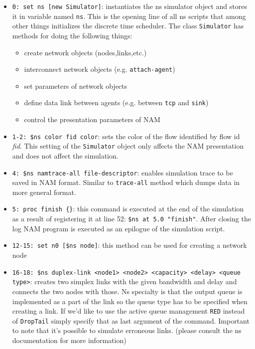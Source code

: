 \documentclass[a4paper]{article}
\begin{document}
\begin{itemize}

    \item \verb!0: set ns [new Simulator]!: instantiates the ns simulator object and stores it in variable named
          \verb!ns!. This is the opening line of all ns scripts that among other things initializes the
          discrete
          time scheduler. The class \verb!Simulator! has methods for doing the following things:

          \begin{itemize}
              \item create network objects (nodes,links,etc.)
              \item interconnect network objects (e.g. \verb!attach-agent!)
              \item set parameters of network objects
              \item define data link between agents (e.g. between \verb!tcp! and \verb!sink!)
              \item control the presentation parameters of NAM
          \end{itemize}

    \item \verb!1-2: $ns color fid color!: sets the color of the flow identified by flow id \emph{fid}. This setting of the
          \verb!Simulator! object only affects the NAM presentation and does not affect the simulation.

    \item \verb!4: $ns namtrace-all file-descriptor!: enables simulation trace to be saved in NAM format. Similar to
          \verb!trace-all!
          method which dumps data in more general format.

    \item \verb!5: proc finish {}!: this command is executed at the end of the simulation as a result of registering it
          at
          line 52: \verb!$ns at 5.0 "finish"!. After closing the log NAM program is executed as an epilogue of the
          simulation
          script.

    \item \verb!12-15: set n0 [$ns node]!: this method can be used for creating a network node

    \item \verb!16-18: $ns duplex-link <node1> <node2> <capacity> <delay> <queue type>!: creates two simplex links with the given bandwidth and delay and connects the two
          nodes
          with those. Ns specialty is that the output queue is implemented as a part of the link so the queue type has
          to be
          specified when creating a link. If we'd like to use the active queue management \verb!RED!
          instead of
          \verb!DropTail! simply specify that as last argument of the command. Important to note that it's
          possible to
          simulate erroneous links. (please consult the ns documentation for more information)


\end{itemize}
\end{document}
